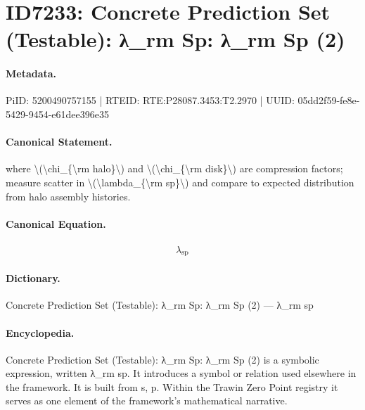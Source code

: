 \section*{ID7233: Concrete Prediction Set (Testable): λ\_rm Sp: λ\_rm Sp (2)}
\paragraph{Metadata.}
PiID: 5200490757155 | RTEID: RTE:P28087.3453:T2.2970 | UUID: 05dd2f59-fe8e-5429-9454-e61dee396e35

\paragraph{Canonical Statement.}
where \textbackslash{}(\textbackslash{}chi\_\{\textbackslash{}rm halo\}\textbackslash{}) and \textbackslash{}(\textbackslash{}chi\_\{\textbackslash{}rm disk\}\textbackslash{}) are compression factors; measure scatter in \textbackslash{}(\textbackslash{}lambda\_\{\textbackslash{}rm sp\}\textbackslash{}) and compare to expected distribution from halo assembly histories.

\paragraph{Canonical Equation.}
\[
\lambda_{\rm sp}
\]

\paragraph{Dictionary.}
Concrete Prediction Set (Testable): λ\_rm Sp: λ\_rm Sp (2) — λ\_rm sp

\paragraph{Encyclopedia.}
Concrete Prediction Set (Testable): λ\_rm Sp: λ\_rm Sp (2) is a symbolic expression, written λ\_rm sp. It introduces a symbol or relation used elsewhere in the framework. It is built from s, p. Within the Trawin Zero Point registry it serves as one element of the framework's mathematical narrative.

